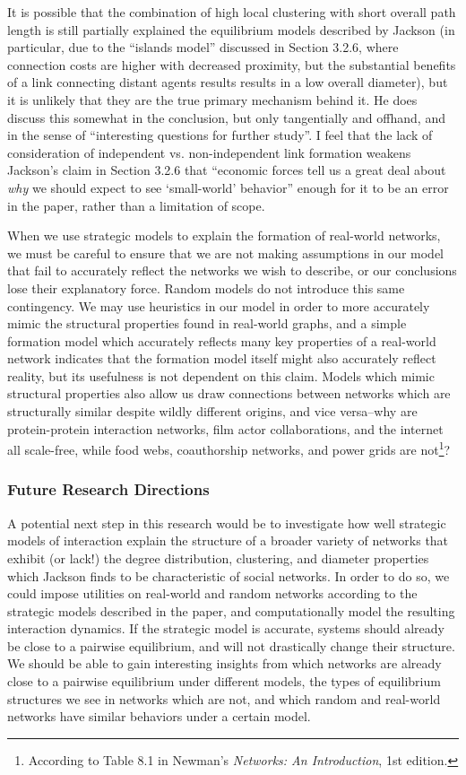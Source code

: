 \documentclass[11pt]{article}
\begin{document}
It is possible that the combination of high local clustering with short overall path length is still partially explained the equilibrium models described by Jackson (in particular, due to the ``islands model'' discussed in Section 3.2.6, where connection costs are higher with decreased proximity, but the substantial benefits of a link connecting distant agents results results in a low overall diameter), but it is unlikely that they are the true primary mechanism behind it. He does discuss this somewhat in the conclusion, but only tangentially and offhand, and in the sense of ``interesting questions for further study''. I feel that the lack of consideration of independent vs. non-independent link formation weakens Jackson's claim in Section 3.2.6 that ``economic forces tell us a great deal about \textit{why} we should expect to see `small-world' behavior'' enough for it to be an error in the paper, rather than a limitation of scope.

When we use strategic models to explain the formation of real-world networks, we must be careful to ensure that we are not making assumptions in our model that fail to accurately reflect the networks we wish to describe, or our conclusions lose their explanatory force. Random models do not introduce this same contingency. We may use heuristics in our model in order to more accurately mimic the structural properties found in real-world graphs, and a simple formation model which accurately reflects many key properties of a real-world network indicates that the formation model itself might also accurately reflect reality, but its usefulness is not dependent on this claim. Models which mimic structural properties also allow us draw connections between networks which are structurally similar despite wildly different origins, and vice versa--why are protein-protein interaction networks, film actor collaborations, and the internet all scale-free, while food webs, coauthorship networks, and power grids are not\footnote{According to Table 8.1 in Newman's \textit{Networks: An Introduction}, 1st edition.}? 

\subsubsection*{Future Research Directions}

A potential next step in this research would be to investigate how well strategic models of interaction explain the structure of a broader variety of networks that exhibit (or lack!) the degree distribution, clustering, and diameter properties which Jackson finds to be characteristic of social networks. In order to do so, we could impose utilities on real-world and random networks according to the strategic models described in the paper, and computationally model the resulting interaction dynamics. If the strategic model is accurate, systems should already be close to a pairwise equilibrium, and will not drastically change their structure. We should be able to gain interesting insights from which networks are already close to a pairwise equilibrium under different models, the types of equilibrium structures we see in networks which are not, and which random and real-world networks have similar behaviors under a certain model. 
\end{document}
